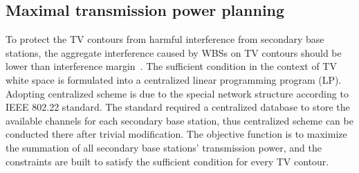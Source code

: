 \subsection{Maximal transmission power planning}
\label{MPowerPlanning}
 
 
To protect the TV contours from harmful interference from secondary base stations, the aggregate interference caused by WBSs on TV contours should be lower than interference margin~\cite{multipleIntf_pimrc11}.
The sufficient condition in the context of TV white space is formulated into a centralized linear programming program (LP).
Adopting centralized scheme is due to the special network structure according to IEEE 802.22 standard. 
The standard required a centralized database to store the available channels for each secondary base station, thus centralized scheme can be conducted there after trivial modification.
The objective function is to maximize the summation of all secondary base stations' transmission power, and the constraints are built to satisfy the sufficient condition for every TV contour. %



